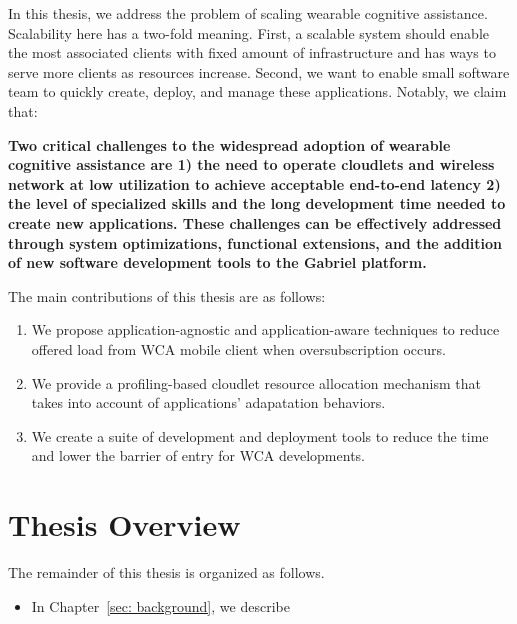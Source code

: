 In this thesis, we address the problem of scaling wearable cognitive assistance.
Scalability here has a two-fold meaning. First, a scalable system should enable
the most associated clients with fixed amount of infrastructure and has ways to
serve more clients as resources increase. Second, we want to enable small
software team to quickly create, deploy, and manage these applications. 
Notably, we claim that:

\textbf{Two critical challenges to the widespread adoption of wearable cognitive
  assistance are 1) the need to operate cloudlets and wireless network at low
  utilization to achieve acceptable end-to-end latency 2) the level of specialized
  skills and the long development time needed to create new applications. These
  challenges can be effectively addressed through system optimizations,
  functional extensions, and the addition of new software development tools to
  the Gabriel platform.}


The main contributions of this thesis are as follows:
\begin{enumerate}
  \item{We propose application-agnostic and application-aware techniques 
  to reduce offered load from WCA mobile client when oversubscription occurs.}
  \item{We provide a profiling-based cloudlet resource allocation mechanism that
  takes into account 
  of applications' adapatation behaviors.}
  \item{We create a suite of development and deployment tools to reduce the time
  and lower the barrier of entry for WCA developments.}
\end{enumerate}

\section{Thesis Overview}

The remainder of this thesis is organized as follows.

\begin{itemize}
  \item{In Chapter~\ref{sec: background}, we describe}
\end{itemize}